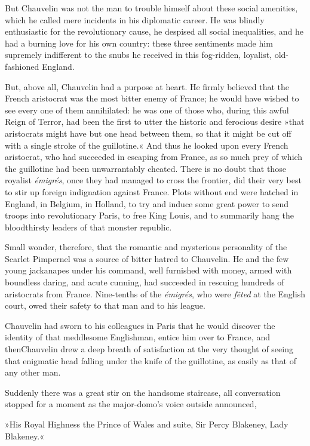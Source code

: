 But Chauvelin was not the man to trouble himself about these social amenities, which he called mere incidents in his diplomatic career. He was blindly enthusiastic for the revolutionary cause, he despised all social inequalities, and he had a burning love for his own country: these three sentiments made him supremely indifferent to the snubs he received in this fog-ridden, loyalist, old-fashioned England.

But, above all, Chauvelin had a purpose at heart. He firmly believed that the French aristocrat was the most bitter enemy of France; he would have wished to see every one of them annihilated: he was one of those who, during this awful Reign of Terror, had been the first to utter the historic and ferocious desire »that aristocrats might have but one head between them, so that it might be cut off with a single stroke of the guillotine.« And thus he looked upon every French aristocrat, who had succeeded in escaping from France, as so much prey of which the guillotine had been unwarrantably cheated. There is no doubt that those royalist \textit{émigrés}, once they had managed to cross the frontier, did their very best to stir up foreign indignation against France. Plots without end were hatched in England, in Belgium, in Holland, to try and induce some great power to send troops into revolutionary Paris, to free King Louis, and to summarily hang the bloodthirsty leaders of that monster republic.

Small wonder, therefore, that the romantic and mysterious personality of the Scarlet Pimpernel was a source of bitter hatred to Chauvelin. He and the few young jackanapes under his command, well furnished with money, armed with boundless daring, and acute cunning, had succeeded in rescuing hundreds of aristocrats from France. Nine-tenths of the \textit{émigrés}, who were \textit{fêted} at the English court, owed their safety to that man and to his league.

Chauvelin had sworn to his colleagues in Paris that he would discover the identity of that meddlesome Englishman, entice him over to France, and then\textellipsis \allowbreak  Chauvelin drew a deep breath of satisfaction at the very thought of seeing that enigmatic head falling under the knife of the guillotine, as easily as that of any other man.

Suddenly there was a great stir on the handsome staircase, all conversation stopped for a moment as the major-domo's voice outside announced,\longdash


»His Royal Highness the Prince of Wales and suite, Sir Percy Blakeney, Lady Blakeney.«


